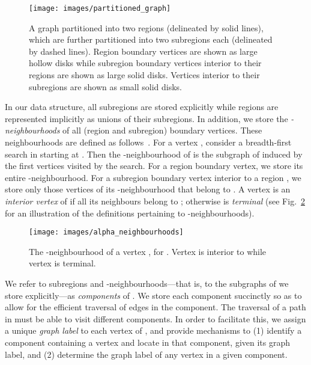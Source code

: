 \begin{figure}[t]
  \centering
  \texttt{[image: images/partitioned\_graph]}
  \caption[Recursively-partitioned graph]{A graph  partitioned into two 
	regions (delineated by solid lines), which are further partitioned into two 
	subregions each (delineated by dashed lines).
    Region boundary vertices are shown as large hollow disks while subregion 
	boundary vertices interior to their regions are shown as large solid disks.
    Vertices interior to their subregions are shown as small solid disks.}
  \label{fig:partitioned_graph}
\end{figure}


In our data structure, all subregions are stored explicitly while
regions are represented implicitly as unions of their subregions.
In addition, we store the \emph{-neighbourhoods} of all (region
and subregion) boundary vertices.
These neighbourhoods are defined
as follows~\cite{DBLP:conf/soda/AgarwalAMVV98}.
For a vertex , consider a breadth-first search in  starting at .
Then the -neighbourhood  of  is the subgraph of 
induced by the first  vertices visited by the search.
For a region boundary vertex, we store its entire -neighbourhood.
For a subregion boundary vertex interior to a region , we store
only those vertices of its -neighbourhood that belong to
.
A vertex  is an \emph{interior vertex} of
 if all its neighbours belong to ;
otherwise  is \emph{terminal}
(see Fig.~\ref{fig:alpha_neighbourhoods} for an illustration of the
definitions pertaining to -neighbourhoods).

\begin{figure}[t]
  \centering
  \texttt{[image: images/alpha\_neighbourhoods]}
  \caption[-neighbourhood of a boundary vertex]{The 
	-neighbourhood  of a vertex ,
    for .
    Vertex  is interior to  while vertex  is terminal.}
  \label{fig:alpha_neighbourhoods}
\end{figure}


We refer to subregions and -neighbourhoods---that is, to the
subgraphs of  we store explicitly---as \emph{components} of .
We store each component succinctly so as to allow for the efficient
traversal of edges in the component.
The traversal of a path in  must be able to visit different components.
In order to facilitate this, we assign a unique \emph{graph label} to each vertex of ,
and provide mechanisms to (1) identify a component containing a vertex  and
locate  in that component, given its graph label, and (2) determine
the graph label of any vertex in a given component.


